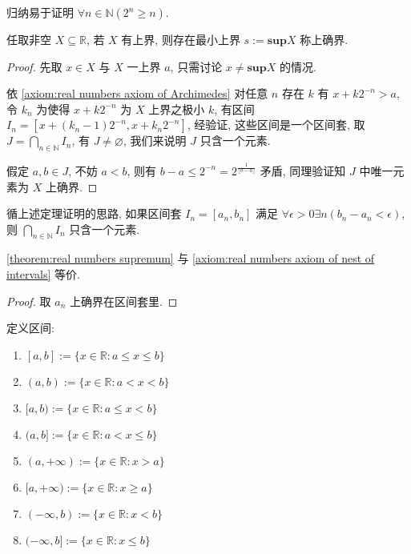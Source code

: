 \begin{lemma}
    归纳易于证明 \(\forall n \in \mathbb{N} (2^n \ge n)\).
\end{lemma}

\begin{theorem}[确界原理]
    \label {theorem:real numbers supremum}
    任取非空 \(X \subseteq \mathbb{R}\), 若 \(X\) 有上界, 则存在最小上界 \(s := \mathbf{sup} X\) 称上确界.

    \begin{proof}
        先取 \(x \in X\) 与 \(X\) 一上界 \(a\), 只需讨论 \(x \neq \mathbf{sup} X\) 的情况.

        依 \ref{axiom:real numbers axiom of Archimedes} 对任意 \(n\) 存在 \(k\) 有 \(x + k 2^{-n} > a\),
        令 \(k_n\) 为使得 \(x + k 2^{-n}\) 为 \(X\) 上界之极小 \(k\), 有区间 \(I_n = [x + (k_n - 1) 2^{-n}, x + k_n 2^{-n}]\),
        经验证, 这些区间是一个区间套, 取 \(J = \bigcap_{n \in \mathbb{N}} I_n\), 有 \(J \neq \varnothing\), 我们来说明 \(J\) 只含一个元素.

        假定 \(a,b \in J\), 不妨 \(a < b\), 则有 \(b - a \le 2^{-n} = 2^{\frac{1}{\lfloor b - a \rfloor}}\) 矛盾, 同理验证知 \(J\) 中唯一元素为 \(X\) 上确界.
    \end{proof}
\end{theorem}

\begin{corollary}
    循上述定理证明的思路, 如果区间套 \(I_n = [a_n, b_n]\) 满足 \(\forall \epsilon > 0 \exists n (b_n - a_n < \epsilon)\),
    则 \(\bigcap_{n \in \mathbb{N}} I_n\) 只含一个元素.
\end{corollary}

\begin{lemma}
    \ref{theorem:real numbers supremum} 与 \ref{axiom:real numbers axiom of nest of intervals} 等价.

    \begin{proof}
        取 \(a_n\) 上确界在区间套里.
    \end{proof}
\end{lemma}

\begin{definition}
    定义区间:
    \begin{enumerate}
        \item \([a,b] := \{x \in \mathbb{R} : a \le x \le b\}\)
        \item \((a,b) := \{x \in \mathbb{R} : a < x < b\}\)
        \item \([a,b) := \{x \in \mathbb{R} : a \le x < b\}\)
        \item \((a,b] := \{x \in \mathbb{R} : a < x \le b\}\)
        \item \((a,+\infty) := \{x \in \mathbb{R} : x > a\}\)
        \item \([a,+\infty) := \{x \in \mathbb{R} : x \ge a\}\)
        \item \((-\infty,b) := \{x \in \mathbb{R} : x < b\}\)
        \item \((-\infty,b] := \{x \in \mathbb{R} : x \le b\}\)
    \end{enumerate}
\end{definition}

